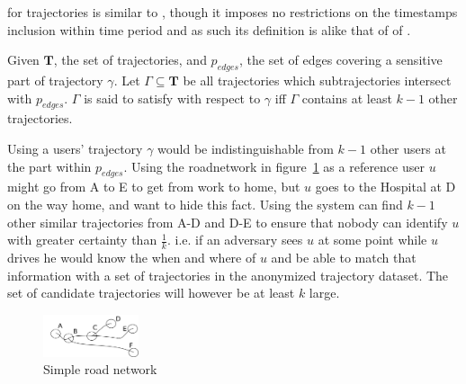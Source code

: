 \kanon for trajectories is similar to \tanonns, though it imposes no restrictions on the timestamps inclusion within time period and as such its definition is alike that of of \tanon.

\begin{deff}[\kanonns]
\label{def:kanon}
Given $\mathbf{T}$, the set of trajectories, and $p_{edges}$, the set of edges covering a sensitive part of trajectory $\gamma$. 
Let $\Gamma \subseteq \mathbf{T}$ be all trajectories which subtrajectories intersect with $p_{edges}$. 
$\Gamma$ is said to satisfy \tanon with respect to $\gamma$ iff $\Gamma$ contains at least $k-1$ other trajectories.
\end{deff}

Using \kanon a users' trajectory $\gamma$ would be indistinguishable from $k-1$ other users at the part within $p_{edges}$. Using the roadnetwork in figure~\ref{fig:roadnetwork} as a reference user $u$ might go from A to E to get from work to home, but $u$ goes to the Hospital at D on the way home, and want to hide this fact. Using \kanon the system can find $k-1$ other similar trajectories from A-D and D-E to ensure that nobody can identify $u$ with greater certainty than $\frac{1}{k}$. i.e. if an adversary sees $u$ at some point while $u$ drives he would know the when and where of $u$ and be able to match that information with a set of trajectories in the anonymized trajectory dataset. The set of candidate trajectories will however be at least $k$ large.


\begin{figure}	
	  \includegraphics[width=0.25\textwidth]{figures/roads.pdf}
       \caption{Simple road network}
  \label{fig:roadnetwork}
\end{figure}


